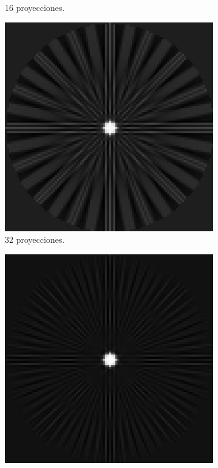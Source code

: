 \documentclass[letterpaper,12pt]{article}
\theoremstyle{plain}
\begin{document}
\begin{figure}[H]
\begin{subfigure}[h]{0.24\textwidth}
           \caption{16 proyecciones.} 
        \end{subfigure}
        \begin{subfigure}[h]{0.24\textwidth}
           \centering
           \includegraphics[width=\textwidth]{Figuras/retroproyeccion_p=32_filter=ramp.png}
           \caption{32 proyecciones.} 
        \end{subfigure}
        \begin{subfigure}[h]{0.24\textwidth}
           \centering
           \includegraphics[width=\textwidth]{Figuras/retroproyeccion_p=64_filter=ramp.png}

\end{subfigure}
\end{figure}
\end{document}
